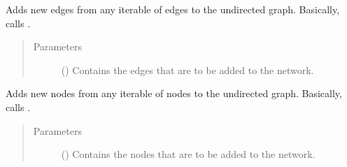 \documentclass[letterpaper,10pt,english]{sphinxmanual}
\begin{document}
\begin{fulllineitems}
\begin{fulllineitems}
\begin{quote}
\begin{description}
\end{description}\end{quote}

\end{fulllineitems}


\begin{fulllineitems}
\label{\detokenize{reference:pypath.main.PyPath.new_edges}}
Adds new edges from any iterable of edges to the undirected
graph. Basically, calls .
\begin{quote}\begin{description}
\item[{Parameters}] \leavevmode
{} () \textendash{} Contains the edges that are to be added to the network.

\end{description}\end{quote}

\end{fulllineitems}


\begin{fulllineitems}
\label{\detokenize{reference:pypath.main.PyPath.new_nodes}}
Adds new nodes from any iterable of nodes to the undirected
graph. Basically, calls .
\begin{quote}\begin{description}
\item[{Parameters}] \leavevmode
{} () \textendash{} Contains the nodes that are to be added to the network.

\end{description}\end{quote}

\end{fulllineitems}



\end{fulllineitems}
\end{document}
